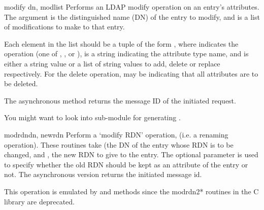 
\begin{methoddesc}[LDAPObject]{modify}{ dn, modlist } %
Performs an LDAP modify operation on an entry's attributes. 
The  argument is the distinguished name (DN) of the entry to modify,
and  is a list of modifications to make to that entry.

Each element in the list  should be a tuple of the form 
,
where  indicates the operation (one of , 
, or ),
 is a string indicating the attribute type name, and 
 is either a string value or a list of string values to add, 
delete or replace respectively.  For the delete operation, 
may be  indicating that all attributes are to be deleted.

The asynchronous method  returns the message ID of the 
initiated request.

You might want to look into sub-module  for
generating .
\end{methoddesc}


\begin{methoddesc}[LDAPObject]{modrdn}{dn, newrdn }
Perform a `modify RDN' operation, (i.e. a renaming operation).
These routines take  (the DN
of the entry whose RDN is to be changed, and , the new RDN to
give to the entry. The optional parameter  is used to specify
whether the old RDN should be kept as an attribute of the entry or not.
The asynchronous version returns the initiated message id.

This operation is emulated by  and  methods
since the modrdn2* routines in the C library are deprecated.
\end{methoddesc}



